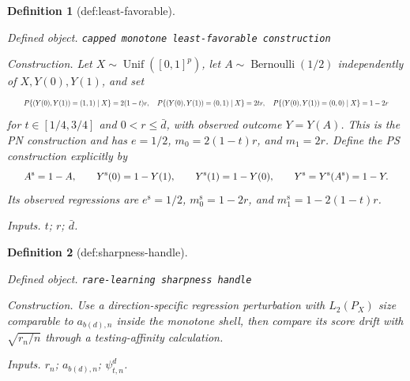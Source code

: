 \documentclass{article}
\newtheorem{definition}{Definition}
\begin{document}
\begin{definition}[def:least-favorable]\label{def:least-favorable}
\par\smallskip\noindent\emph{Defined object.} \texttt{capped monotone least-\allowbreak{}favorable construction}
\par\smallskip\noindent\emph{Construction.} Let \(X\sim\operatorname{Unif}([0,1]^p)\), let \(A\sim\operatorname{Bernoulli}(1/2)\) independently of \(X,Y(0),Y(1)\), and set
\[
\makebox[\linewidth][c]{\resizebox{0.98\linewidth}{!}{\par\noindent \makebox[\linewidth][c]{\resizebox{0.98\linewidth}{!}{\(\displaystyle \displaystyle P\{(Y(0),Y(1))=(1,1)\mid X\}=2(1-t)r,\quad P\{(Y(0),Y(1))=(0,1)\mid X\}=2tr,\quad P\{(Y(0),Y(1))=(0,0)\mid X\}=1-2r\)}}\par\noindent}}
\]
for \(t\in[1/4,3/4]\) and \(0<r\le\bar d\), with observed outcome \(Y=Y(A)\). This is the PN construction and has \(e=1/2\), \(m_0=2(1-t)r\), and \(m_1=2r\). Define the PS construction explicitly by
\[
\makebox[\linewidth][c]{\resizebox{0.98\linewidth}{!}{\par\noindent \makebox[\linewidth][c]{\resizebox{0.98\linewidth}{!}{\(\displaystyle \displaystyle A^{\mathrm s}=1-A,\qquad Y^{\mathrm s}(0)=1-Y(1),\qquad Y^{\mathrm s}(1)=1-Y(0),\qquad Y^{\mathrm s}=Y^{\mathrm s}(A^{\mathrm s})=1-Y.\)}}\par\noindent}}
\]
Its observed regressions are \(e^{\mathrm s}=1/2\), \(m_0^{\mathrm s}=1-2r\), and \(m_1^{\mathrm s}=1-2(1-t)r\).
\par\smallskip\noindent\emph{Inputs.} \(t\); \(r\); \(\bar d\).
\end{definition}

\begin{definition}[def:sharpness-handle]\label{def:sharpness-handle}
\par\smallskip\noindent\emph{Defined object.} \texttt{rare-\allowbreak{}learning sharpness handle}
\par\smallskip\noindent\emph{Construction.} Use a direction-specific regression perturbation with \(L_2(P_X)\) size comparable to \(a_{b(d),n}\) inside the monotone shell, then compare its score drift with \(\sqrt{r_n/n}\) through a testing-affinity calculation.
\par\smallskip\noindent\emph{Inputs.} \(r_n\); \(a_{b(d),n}\); \(\psi_{t,n}^d\).
\end{definition}
\end{document}
